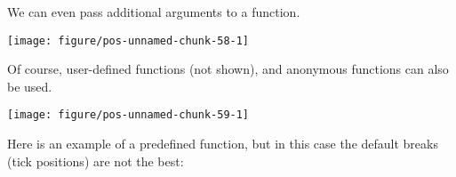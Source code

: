 \documentclass[paper=a4,headsepline,BCOR=12mm,twoside,open=right,%
titlepage,headings=small,fontsize=10pt,index=totoc,bibliography=totoc,%
captions=tableheading,captions=nooneline]{scrbook}\usepackage{knitr}
\begin{document}
We can even pass additional arguments to a function.

\begin{knitrout}\footnotesize
{}\color{fgcolor}\begin{kframe}
\begin{alltt}
\hlstd{(}\hlstd{(}\hlstd{=}\hlopt{-}\hlopt{:}\hlstd{),} \hlstd{(} \hlopt{+}
  \hlstd{(}   \hlstd{=} \hlstd{(} \hlstd{=} \hlstd{,}  \hlstd{=} \hlstd{))}
\end{alltt}
\end{kframe}

{\centering \texttt{[image: figure/pos-unnamed-chunk-58-1]} 

}



\end{knitrout}

Of course, user-defined functions (not shown), and anonymous functions can also be used.

\begin{knitrout}\footnotesize
{}\color{fgcolor}\begin{kframe}
\begin{alltt}
\hlstd{(}\hlstd{(}\hlstd{=}\hlopt{:}\hlstd{),} \hlstd{(} \hlopt{+}
  \hlstd{(} \hlstd{=} \hlstd{(}\hlstd{,} \hlstd{,}  \hlopt{+}  \hlopt{*} \hlopt{^}\hlstd{\},}
                 \hlstd{=} \hlstd{(} \hlstd{=} \hlstd{,}  \hlstd{=} \hlstd{))}
\end{alltt}
\end{kframe}

{\centering \texttt{[image: figure/pos-unnamed-chunk-59-1]} 

}



\end{knitrout}

Here is an example of a predefined function, but in this case the default breaks (tick positions) are not the best:
\end{document}
